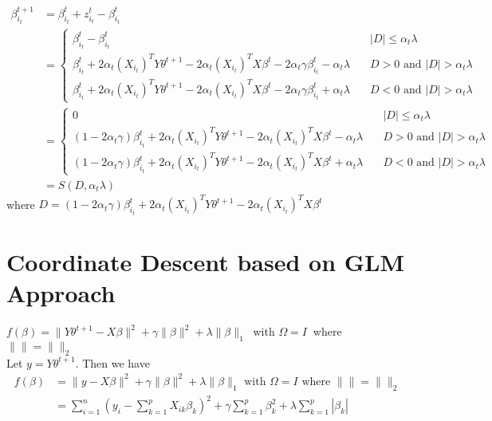 \documentclass[12pt, reqno]{amsart}
\theoremstyle{definition}
\theoremstyle{remark}
\begin{document}
\begin{equation*}
\begin{split}
\beta_{i_t}^{t+1} &= \beta_{i_t}^t + z_{i_t}^t - \beta_{i_t}^t \\
		&= \left\{
		\begin{array}{ll}
				\beta_{i_t}^t - \beta_{i_t}^t  & \quad |D| \leq 
				\alpha_t \lambda \\
				\beta_{i_t}^t + 2 \alpha_t (X_{i_t})^T Y \theta^{t+1} 
				- 2 \alpha_t (X_{i_t})^T X\beta^t - 2 \alpha_t 
				\gamma\beta_{i_t}^t - \alpha_t \lambda
				 & \quad D > 0 \text{ and } |D| > \alpha_t \lambda \\
				\beta_{i_t}^t + 2 \alpha_t (X_{i_t})^T Y \theta^{t+1} 
				- 2 \alpha_t (X_{i_t})^T X\beta^t - 2 \alpha_t 
				\gamma\beta_{i_t}^t + \alpha_t \lambda
				& \quad D < 0 \text{ and } |D| > \alpha_t \lambda
			\end{array}
			\right. \\
		&= \left\{
		\begin{array}{ll}
				0  & \quad |D| \leq \alpha_t \lambda \\
				(1-2 \alpha_t \gamma)\beta_{i_t}^t + 2 \alpha_t 
				(X_{i_t})^T Y \theta^{t+1} - 2 \alpha_t (X_{i_t})^T 
				X\beta^t - \alpha_t \lambda
				 & \quad D > 0 \text{ and } |D| > \alpha_t \lambda \\
				(1-2 \alpha_t \gamma)\beta_{i_t}^t + 2 \alpha_t 
				(X_{i_t})^T Y \theta^{t+1} - 2 \alpha_t (X_{i_t})^T 
				X\beta^t + \alpha_t \lambda
				& \quad D < 0 \text{ and } |D| > \alpha_t \lambda
			\end{array}
			\right. \\	
		&= S(D, \alpha_t \lambda)		
\end{split}
\end{equation*}
where $D = (1-2 \alpha_t \gamma)\beta_{i_t}^t + 2 \alpha_t (X_{i_t})^T Y \theta^{t+1} - 2 \alpha_t (X_{i_t})^T X\beta^t$

\newpage

\section{Coordinate Descent based on GLM Approach}
$f(\beta) = \|Y \theta^{t+1} - X \beta \|^2 + \gamma \|\beta\|^2 + \lambda \|\beta\|_1 \ $ with $\Omega = I \ $ where $ \| \| = \|  \|_2$\\

Let $y = Y \theta^{t+1}$. Then we have\\
\begin{equation*}
\begin{split}
f(\beta) &= \|y - X \beta \|^2 + \gamma \|\beta\|^2 + \lambda \|\beta\|_1 \text{ with } \Omega = I  \text{ where }  \| \| = \|  \|_2 \\
	&= \sum_{i = 1}^{n} (y_i - \sum_{k = 1}^{p} X_{ik} \beta_k )^2 + \gamma \sum_{k = 1}^{p} \beta_k^2 + \lambda \sum_{k = 1}^{p} |\beta_k|
\end{split}
\end{equation*}
\end{document}
